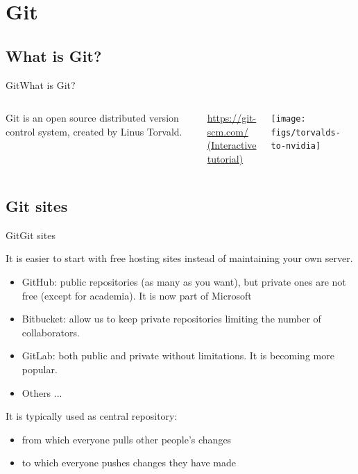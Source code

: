 \documentclass[10pt,compress]{beamer} %
\begin{document}
\section{Git}

\subsection{What is Git?}

\begin{frame}{Git}{What is Git?}

\begin{columns}
Git is an open source distributed version control system, created by Linus Torvald.

\url{https://git-scm.com/}
\\
\href{https://try.github.io/levels/1/challenges/1}{(Interactive tutorial)}
\begin{center}
 \texttt{[image: figs/torvalds-to-nvidia]}
\end{center}
\end{columns}

\end{frame}

\subsection{Git sites}
\begin{frame}{Git}{Git sites}


It is easier to start with free hosting sites instead of maintaining your own server.

\begin{itemize}
\item \alert{GitHub}: public repositories (as many as you want), but private ones are not free (except for academia). It is now part of Microsoft
 \item \alert{Bitbucket}: allow us to keep private repositories limiting the number of collaborators.
 \item \alert{GitLab}: both public and private without limitations. It is becoming more popular.
 \item Others ...
\end{itemize}

It is typically used as central repository:
\begin{itemize}
 \item from which everyone pulls other people’s changes
 \item to which everyone pushes changes they have made
\end{itemize}

\end{frame}
\end{document}

